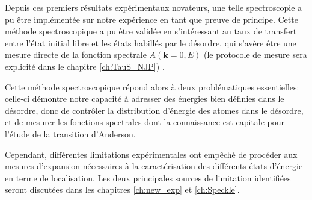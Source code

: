 Depuis ces premiers résultats expérimentaux novateurs, une telle spectroscopie a pu être implémentée sur notre expérience en tant que preuve de principe. Cette méthode spectroscopique a pu être validée en s'intéressant au taux de transfert entre l'état initial libre et les états habillés par le désordre, qui s'avère être une mesure directe de la fonction spectrale $A(\mathbf{k}=0,E)$ (le protocole de mesure sera explicité dans le chapitre \ref{ch:TauS_NJP}) \citep{volchkov2018measurement}.

Cette méthode spectroscopique répond alors à deux problématiques essentielles: celle-ci démontre notre capacité à adresser des énergies bien définies dans le désordre, donc de contrôler la distribution d'énergie des atomes dans le désordre, et de mesurer les fonctions spectrales dont la connaissance est capitale pour l'étude de la transition d'Anderson.
 
Cependant, différentes limitations expérimentales ont empêché de procéder aux mesures d'expansion nécessaires à la caractérisation des différents états d'énergie en terme de localisation. Les deux principales sources de limitation identifiées seront discutées dans les chapitres \ref{ch:new_exp} et \ref{ch:Speckle}.

